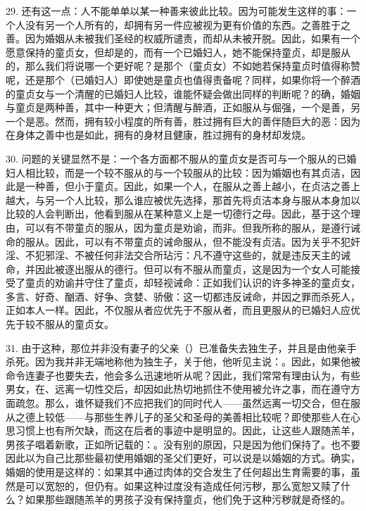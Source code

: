 29. 还有这一点：人不能单单以某一种善来彼此比较。因为可能发生这样的事：一个人没有另一个人所有的，却拥有另一件应被视为更有价值的东西。之善胜于之善。因为婚姻从未被我们圣经的权威所谴责，而却从未被开脱。因此，如果有一个愿意保持的童贞女，但却是的，而有一个已婚妇人，她不能保持童贞，却是服从的，那么我们将说哪一个更好呢？是那个（童贞女）不如她若保持童贞时值得称赞呢，还是那个（已婚妇人）即使她是童贞也值得责备呢？同样，如果你将一个醉酒的童贞女与一个清醒的已婚妇人比较，谁能怀疑会做出同样的判断呢？的确，婚姻与童贞是两种善，其中一种更大；但清醒与醉酒，正如服从与倔强，一个是善，另一个是恶。然而，拥有较小程度的所有善，胜过拥有巨大的善伴随巨大的恶：因为在身体之善中也是如此，拥有的身材且健康，胜过拥有的身材却发烧。\par

30. 问题的关键显然不是：一个各方面都不服从的童贞女是否可与一个服从的已婚妇人相比较，而是一个较不服从的与一个较服从的比较：因为婚姻也有其贞洁，因此是一种善，但小于童贞。因此，如果一个人，在服从之善上越小，在贞洁之善上越大，与另一个人比较，那么谁应被优先选择，那首先将贞洁本身与服从本身加以比较的人会判断出，他看到服从在某种意义上是一切德行之母。因此，基于这个理由，可以有不带童贞的服从，因为童贞是劝谕，而非。但我所称的服从，是遵行诫命的服从。因此，可以有不带童贞的诫命服从，但不能没有贞洁。因为关乎不犯奸淫、不犯邪淫、不被任何非法交合所玷污：凡不遵守这些的，就是违反天主的诫命，并因此被逐出服从的德行。但可以有不服从而童贞，这是因为一个女人可能接受了童贞的劝谕并守住了童贞，却轻视诫命：正如我们认识的许多神圣的童贞女，多言、好奇、酗酒、好争、贪婪、骄傲：这一切都违反诫命，并因之罪而杀死人，正如本人一样。因此，不仅服从者应优先于不服从者，而且更服从的已婚妇人应优先于较不服从的童贞女。\par

31. 由于这种，那位并非没有妻子的父亲（）已准备失去独生子，并且是由他亲手杀死。因为我并非无端地称他为独生子，关于他，他听见主说：。因此，如果他被命令连妻子也要失去，他会多么迅速地听从呢？因此，我们常常有理由认为，有些男女，在、远离一切性交后，却因如此热切地抓住不使用被允许之事，而在遵守方面疏忽。那么，谁怀疑我们不应把我们的同时代人——虽然远离一切交合，但在服从之德上较低——与那些生养儿子的圣父和圣母的美善相比较呢？即使那些人在心思习惯上也有所欠缺，而这在后者的事迹中是明显的。因此，让这些人跟随羔羊，男孩子唱着新歌，正如所记载的：。没有别的原因，只是因为他们保持了。也不要因此以为自己比那些最初使用婚姻的圣父们更好，可以说是以婚姻的方式。确实，婚姻的使用是这样的：如果其中通过肉体的交合发生了任何超出生育需要的事，虽然是可以宽恕的，但仍有。如果这种过度没有造成任何污秽，那么宽恕又赎了什么？如果那些跟随羔羊的男孩子没有保持童贞，他们免于这种污秽就是奇怪的。\par

